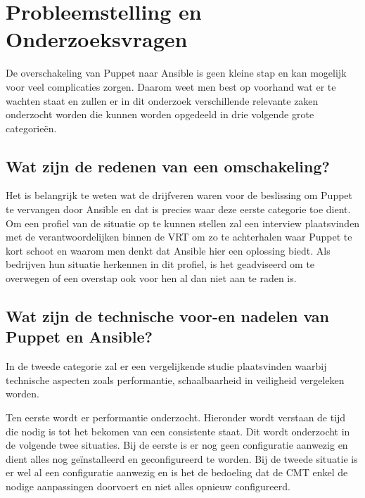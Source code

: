 \section{Probleemstelling en Onderzoeksvragen}
\label{sec:onderzoeksvragen}




De overschakeling van Puppet naar Ansible is geen kleine stap en kan mogelijk voor veel complicaties zorgen. Daarom weet men best op voorhand wat er te wachten staat en zullen er in dit onderzoek verschillende relevante zaken onderzocht worden die kunnen worden opgedeeld in drie volgende grote categorie\"en. 


\subsection{Wat zijn de redenen van een omschakeling?}

Het is belangrijk te weten wat de drijfveren waren voor de beslissing om Puppet te vervangen door Ansible en dat is precies waar deze eerste categorie toe dient. Om een profiel van de situatie op te kunnen stellen zal een interview plaatsvinden met de verantwoordelijken binnen de VRT om zo te achterhalen waar Puppet te kort schoot en waarom men denkt dat Ansible hier een oplossing biedt. Als bedrijven hun situatie herkennen in dit profiel, is het geadviseerd om te overwegen of een overstap ook voor hen al dan niet aan te raden is.

\subsection{Wat zijn de technische voor-en nadelen van Puppet en Ansible?}

In de tweede categorie zal er een vergelijkende studie plaatsvinden waarbij technische aspecten zoals performantie, schaalbaarheid in veiligheid vergeleken worden. 
 
 Ten eerste wordt er performantie onderzocht. Hieronder wordt verstaan de tijd die nodig is tot het bekomen van een consistente staat. Dit wordt onderzocht in de volgende twee situaties. Bij de eerste is er nog geen configuratie aanwezig en dient alles nog ge\"installeerd en geconfigureerd te worden. Bij de tweede situatie is er wel al een configuratie aanwezig en is het de bedoeling dat de CMT enkel de nodige aanpassingen doorvoert en niet alles opnieuw configureerd. 

